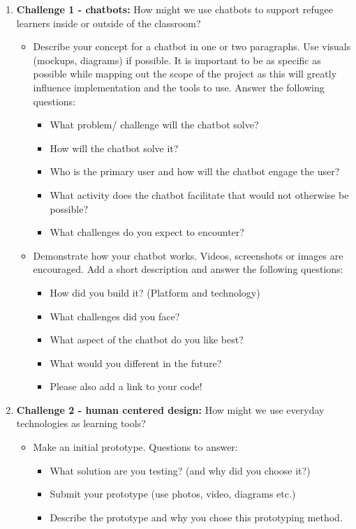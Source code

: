 \documentclass[12pt,twoside,vi]{mitthesis}
\begin{document}
\begin{enumerate}
\item \textbf{Challenge 1 - chatbots:} How might we use chatbots to support refugee learners inside or outside of the classroom? 
\begin{itemize}
\item Describe your concept for a chatbot in one or two paragraphs. Use visuals (mockups, diagrams) if possible. It is important to be as specific as possible while mapping out the scope of the project as this will greatly influence implementation and the tools to use. Answer the following questions:
\begin{itemize}
\item What problem/ challenge will the chatbot solve? 
\item How will the chatbot solve it? 
\item Who is the primary user and how will the chatbot engage the user?
\item What activity does the chatbot facilitate that would not otherwise be possible? 
\item What challenges do you expect to encounter?
\end{itemize}
\item Demonstrate how your chatbot works. Videos, screenshots or images are encouraged. Add a short description and answer the following questions: 
\begin{itemize}
\item How did you build it? (Platform and technology)
\item What challenges did you face?
\item What aspect of the chatbot do you like best? 
\item What would you different in the future? 
\item Please also add a link to your code!
\end{itemize}
\end{itemize}
\item \textbf{Challenge 2 - human centered design:} How might we use everyday technologies as learning tools?
\begin{itemize}
\item Make an initial prototype. Questions to answer:
\begin{itemize}
\item What solution are you testing? (and why did you choose it?)
\item Submit your prototype (use photos, video, diagrams etc.)
\item Describe the prototype and why you chose this prototyping method. 

\end{itemize}
\end{itemize}
\end{enumerate}
\end{document}
